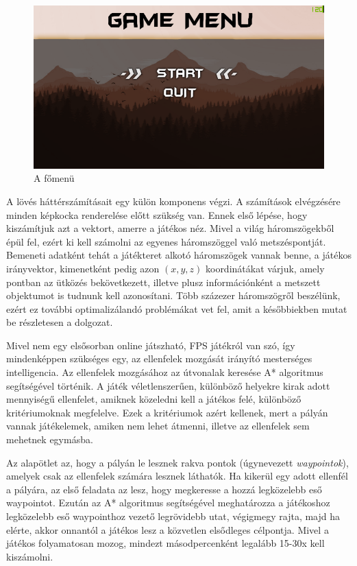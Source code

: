 \begin{figure}[h]
\centering
\includegraphics[scale=1.6]{kepek/menu.png}
\caption{A főmenü}
\label{fig:menu}
\end{figure}


A lövés háttérszámításait egy külön komponens végzi. A számítások elvégzésére minden képkocka renderelése előtt szükség van. Ennek első lépése, hogy kiszámítjuk azt a vektort, amerre a játékos néz. Mivel a világ háromszögekből épül fel, ezért ki kell számolni az egyenes háromszöggel való metszéspontját. Bemeneti adatként tehát a játékteret alkotó háromszögek vannak benne, a játékos irányvektor, kimenetként pedig azon $(x, y, z)$ koordinátákat várjuk, amely pontban az ütközés bekövetkezett, illetve plusz információnként a metszett objektumot is tudnunk kell azonosítani. Több százezer háromszögről beszélünk, ezért ez további optimalizálandó problémákat vet fel, amit a későbbiekben mutat be részletesen a dolgozat.


Mivel nem egy elsősorban online játszható, FPS játékról van szó, így mindenképpen szükséges egy, az ellenfelek mozgását irányító mesterséges intelligencia. Az ellenfelek mozgásához az útvonalak keresése A* algoritmus segítségével történik. A játék véletlenszerűen, különböző helyekre kirak adott mennyiségű ellenfelet, amiknek közeledni kell a játékos felé, különböző kritériumoknak megfelelve. Ezek a kritériumok azért kellenek, mert a pályán vannak játékelemek, amiken nem lehet átmenni, illetve az ellenfelek sem mehetnek egymásba. 

Az alapötlet az, hogy a pályán le lesznek rakva pontok (úgynevezett \textit{waypointok}), amelyek csak az ellenfelek számára lesznek láthatók. Ha kikerül egy adott ellenfél a pályára, az első feladata az lesz, hogy megkeresse a hozzá legközelebb eső waypointot. Ezután az A* algoritmus segítségével meghatározza a játékoshoz legközelebb eső waypointhoz vezető legrövidebb utat, végigmegy rajta, majd ha elérte, akkor onnantól a játékos lesz a közvetlen elsődleges célpontja. Mivel a játékos folyamatosan mozog, mindezt másodpercenként legalább 15-30x kell kiszámolni.

